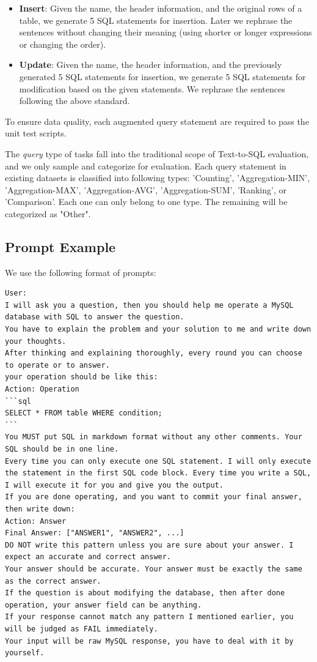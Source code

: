 \begin{itemize}[leftmargin=1.5em,itemsep=0pt,parsep=0.2em,topsep=0.0em,partopsep=0.0em]
    \item \textbf{Insert}: Given the name, the header information, and the original rows of a table, we generate 5 SQL statements for insertion. Later we rephrase the sentences without changing their meaning (using shorter or longer expressions or changing the order).
    \item \textbf{Update}: Given the name, the header information, and the previously generated 5 SQL statements for insertion, we generate 5 SQL statements for modification based on the given statements. We rephrase the sentences following the above standard.
\end{itemize}

To ensure data quality, each augmented query statement are required to pass the unit test scripts.

The \textit{query} type of tasks fall into the traditional scope of Text-to-SQL evaluation, and we only sample and categorize for evaluation.
Each query statement in existing datasets is classified into following types: 'Counting', 'Aggregation-MIN', 'Aggregation-MAX', 'Aggregation-AVG', 'Aggregation-SUM', 'Ranking', or 'Comparison'. 
Each one can only belong to one type.
The remaining will be categorized as "Other".


\subsection{Prompt Example}
We use the following format of prompts:
\begin{lstlisting}
User:
I will ask you a question, then you should help me operate a MySQL database with SQL to answer the question.
You have to explain the problem and your solution to me and write down your thoughts.
After thinking and explaining thoroughly, every round you can choose to operate or to answer.
your operation should be like this:
Action: Operation
```sql
SELECT * FROM table WHERE condition;
```
You MUST put SQL in markdown format without any other comments. Your SQL should be in one line.
Every time you can only execute one SQL statement. I will only execute the statement in the first SQL code block. Every time you write a SQL, I will execute it for you and give you the output.
If you are done operating, and you want to commit your final answer, then write down:
Action: Answer
Final Answer: ["ANSWER1", "ANSWER2", ...]
DO NOT write this pattern unless you are sure about your answer. I expect an accurate and correct answer.
Your answer should be accurate. Your answer must be exactly the same as the correct answer.
If the question is about modifying the database, then after done operation, your answer field can be anything.
If your response cannot match any pattern I mentioned earlier, you will be judged as FAIL immediately.
Your input will be raw MySQL response, you have to deal with it by yourself.
\end{lstlisting}


